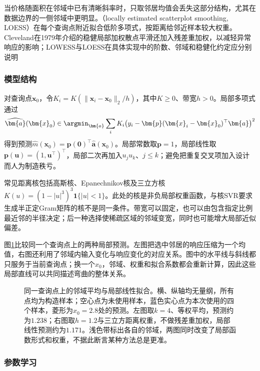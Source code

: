 当价格随面积在邻域中已有清晰斜率时，只取邻居均值会丢失这部分结构，尤其在数据边界的一侧邻域中更明显。（locally estimated scatterplot smoothing, LOESS）在每个查询点附近拟合低阶多项式，按距离给邻近样本较大权重。Cleveland在1979年介绍的稳健局部加权散点平滑还加入残差重加权，以减轻异常响应的影响；LOWESS与LOESS在具体实现中的阶数、邻域和稳健化约定应分别说明

\subsubsection{模型结构}

对查询点$\bm{x}_0$，令$K_i=K(\lVert\bm{x}_i-\bm{x}_0\rVert_2/h)$，其中$K\geq0$、带宽$h>0$。局部多项式通过
\begin{equation}
  \widehat{\bm{a}}(\bm{x}_0)
  \in\argmin_{\bm{a}}\sum_iK_i
     \bigl(y_i-\bm{p}(\bm{x}_i-\bm{x}_0)^{\top}\bm{a}\bigr)^2
  \label{eq:regression-local-polynomial}
\end{equation}
得到预测$\widehat m(\bm{x}_0)=\bm{p}(\bm{0})^{\top}\widehat{\bm{a}}(\bm{x}_0)$。局部常数取$\bm{p}=1$，局部线性取$\bm{p}(\bm{u})=(1,\bm{u}^{\top})^{\top}$，局部二次再加入$u_ju_k$、$j\leq k$；避免把重复交叉项加入设计而人为制造秩亏。

常见距离核包括高斯核、Epanechnikov核及三立方核$K(u)=(1-|u|^3)^3\mathbf{1}\{|u|<1\}$。此处的核是非负局部权重函数，与核SVR要求生成半正定Gram矩阵的核不是同一条件。带宽可以固定，也可以由包含指定比例最近邻的半径决定；后一种选择使稀疏区域的邻域变宽，同时也可能增大局部近似偏差。

图\ref{fig:regression-neighborhood}比较同一个查询点上的两种局部预测。左图把选中邻居的响应压缩为一个均值，右图还利用了邻域内输入变化与响应变化的对应关系。图中的水平线与斜线都只服务于当前查询点；换一个$x_0$，邻域、权重和拟合系数都会重新计算，因此这些局部直线可以共同描述弯曲的整体关系。

\begin{figure}[htbp]
  \centering
  
  \caption{同一查询点上的邻域平均与局部线性拟合。横、纵轴均无量纲，所有点均为构造样本；空心点为未使用样本，蓝色实心点为本次使用的四个样本，菱形为$x_0=2.8$处的预测。左图取$k=4$、等权平均，预测约为$1.238$；右图取$h=1.2$与三立方距离权重，不做残差重加权，局部线性预测约为$1.171$。浅色带标出各自的邻域，两图同时改变了局部函数形式和权重，不据此断言某种方法总是更准。}
  \label{fig:regression-neighborhood}
\end{figure}

\subsubsection{参数学习}

